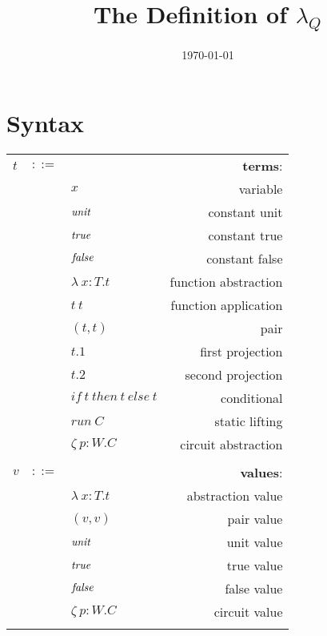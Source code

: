 \documentclass[12pt]{article}
\title{The Definition of $\lambda_Q$}
\author{}
\date{\today}
\begin{document}
\maketitle
\tableofcontents



\section{Syntax}

\begin{longtable}[c]{lclr}
  \label{tab:table1}\\
  \toprule
  $t$ &$::=$ &  &\textbf{terms}: \\
      & &$x$ &variable\\
      & &$\mathit{unit}$ &constant unit\\
      & &$\mathit{true}$ &constant true\\
      & &$\mathit{false}$ &constant false\\
      & &$\lambda\ x:T.t$ &function abstraction\\
      & &$t\ t$ &function application\\
      & &$(t, t)$ &pair\\
      & &$t.1$ &first projection\\
      & &$t.2$ &second projection\\
      & &$\mathit{if}\ t\ \mathit{then}\ t\ \mathit{else}\ t$ &conditional\\
      & &$\mathit{run}\ C$ &static lifting\\
      & &$\zeta \ p:W . C$ &circuit abstraction\\
  \\
  
  $v$ &$::=$ &  &\textbf{values}: \\
      & &$\lambda\ x:T.t$ &abstraction value\\
      & &$(v, v)$ &pair value\\
      & &$\mathit{unit}$ &unit value\\
      & &$\mathit{true}$ &true value\\
      & &$\mathit{false}$ &false value\\
      & &$\zeta\ p:W . C$ &circuit value\\
  \\


\end{longtable}
\end{document}
